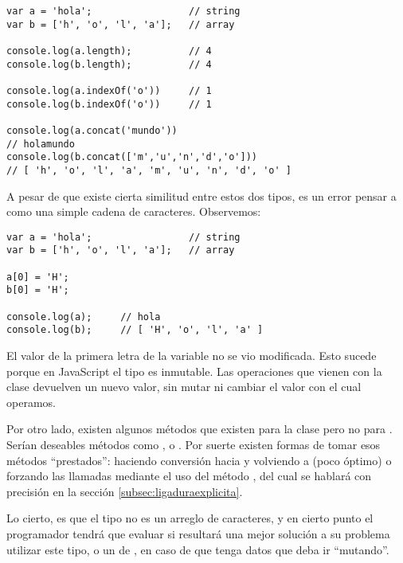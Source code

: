 \begin{lstlisting}[title={Similitudes entre \code{string} y un \code{array}}]
var a = 'hola';                 // string
var b = ['h', 'o', 'l', 'a'];   // array

console.log(a.length);          // 4
console.log(b.length);          // 4

console.log(a.indexOf('o'))     // 1
console.log(b.indexOf('o'))     // 1

console.log(a.concat('mundo'))  
// holamundo
console.log(b.concat(['m','u','n','d','o']))
// ​​​​​[ 'h', 'o', 'l', 'a', 'm', 'u', 'n', 'd', 'o' ]​​​​​
\end{lstlisting}

A pesar de que existe cierta similitud entre estos dos tipos, es un error pensar a  como una simple cadena de caracteres. Observemos:

\begin{lstlisting}
var a = 'hola';                 // string
var b = ['h', 'o', 'l', 'a'];   // array

a[0] = 'H';
b[0] = 'H';

console.log(a);		// hola
console.log(b);		// ​​​​​[ 'H', 'o', 'l', 'a' ]​​​​​
\end{lstlisting}

El valor de la primera letra de la variable  no se vio modificada. Esto sucede porque en JavaScript el tipo  es inmutable. Las operaciones que vienen con la clase  devuelven un nuevo valor, sin mutar ni cambiar el valor con el cual operamos.

Por otro lado, existen algunos métodos que existen para la clase  pero no para . Serían deseables métodos como ,  o . Por suerte existen formas de tomar esos métodos "`prestados"': haciendo conversión hacia  y volviendo a  (poco óptimo) o forzando las llamadas mediante el uso del método , del cual se hablará con precisión en la sección \ref{subsec:ligaduraexplicita}.

Lo cierto, es que el tipo  no es un arreglo de caracteres, y en cierto punto el programador tendrá que evaluar si resultará una mejor solución a su problema utilizar este tipo, o un  de , en caso de que tenga datos que deba ir "`mutando"'.

\subsection{}

